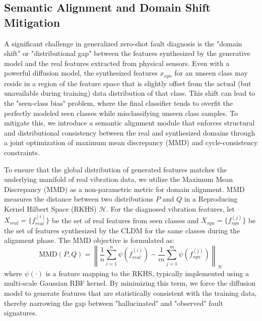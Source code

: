\subsection{Semantic Alignment and Domain Shift Mitigation}
\label{sec:alignment}
A significant challenge in generalized zero-shot fault diagnosis is the "domain shift" or "distributional gap" between the features synthesized by the generative model and the real features extracted from physical sensors. Even with a powerful diffusion model, the synthesized features $x_{syn}$ for an unseen class may reside in a region of the feature space that is slightly offset from the actual (but unavailable during training) data distribution of that class. This shift can lead to the "seen-class bias" problem, where the final classifier tends to overfit the perfectly modeled seen classes while misclassifying unseen class samples. To mitigate this, we introduce a semantic alignment module that enforces structural and distributional consistency between the real and synthesized domains through a joint optimization of maximum mean discrepancy (MMD) and cycle-consistency constraints.

To ensure that the global distribution of generated features matches the underlying manifold of real vibration data, we utilize the Maximum Mean Discrepancy (MMD) \cite{Gretton2012MMD} as a non-parametric metric for domain alignment. MMD measures the distance between two distributions $P$ and $Q$ in a Reproducing Kernel Hilbert Space (RKHS) $\mathcal{H}$. For the diagnosed vibration features, let $X_{real} = \{f_{real}^{(i)}\}$ be the set of real features from seen classes and $X_{syn} = \{f_{syn}^{(j)}\}$ be the set of features synthesized by the CLDM for the same classes during the alignment phase. The MMD objective is formulated as:
\begin{equation}
\text{MMD}(P, Q) = \left\| \frac{1}{n} \sum_{i=1}^n \psi(f_{real}^{(i)}) - \frac{1}{m} \sum_{j=1}^m \psi(f_{syn}^{(j)}) \right\|_{\mathcal{H}}
\end{equation}
where $\psi(\cdot)$ is a feature mapping to the RKHS, typically implemented using a multi-scale Gaussian RBF kernel. By minimizing this term, we force the diffusion model to generate features that are statistically consistent with the training data, thereby narrowing the gap between "hallucinated" and "observed" fault signatures.

